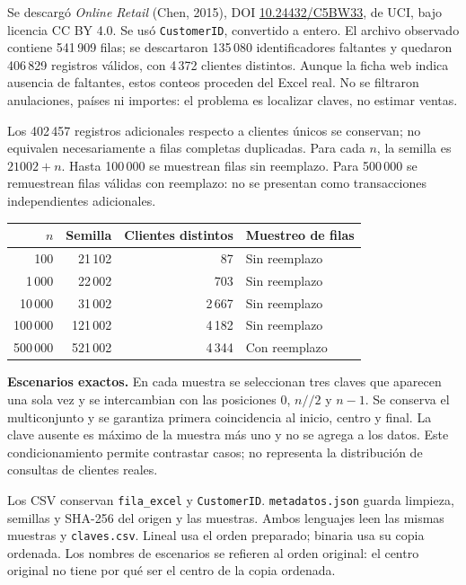 \documentclass[10pt,a4paper]{article}
\newcommand{\titulo}[1]{\vspace{3pt}{\large\bfseries\color{azul}#1}\par}
\begin{document}


\newpage
\titulo{3. Dataset y preparación}
Se descargó \textit{Online Retail} (Chen, 2015), DOI \href{https://doi.org/10.24432/C5BW33}{10.24432/C5BW33}, de UCI, bajo licencia CC BY 4.0. Se usó \texttt{CustomerID}, convertido a entero. El archivo observado contiene 541\,909 filas; se descartaron 135\,080 identificadores faltantes y quedaron 406\,829 registros válidos, con 4\,372 clientes distintos. Aunque la ficha web indica ausencia de faltantes, estos conteos proceden del Excel real. No se filtraron anulaciones, países ni importes: el problema es localizar claves, no estimar ventas.

Los 402\,457 registros adicionales respecto a clientes únicos se conservan; no equivalen necesariamente a filas completas duplicadas. Para cada $n$, la semilla es $21002+n$. Hasta 100\,000 se muestrean filas sin reemplazo. Para 500\,000 se remuestrean filas válidas con reemplazo: no se presentan como transacciones independientes adicionales.
\begin{center}
\begin{tabular}{rrrl}
\toprule
$n$ & Semilla & Clientes distintos & Muestreo de filas\\\midrule
100 & 21\,102 & 87 & Sin reemplazo\\
1\,000 & 22\,002 & 703 & Sin reemplazo\\
10\,000 & 31\,002 & 2\,667 & Sin reemplazo\\
100\,000 & 121\,002 & 4\,182 & Sin reemplazo\\
500\,000 & 521\,002 & 4\,344 & Con reemplazo\\\bottomrule
\end{tabular}\end{center}
\textbf{Escenarios exactos.} En cada muestra se seleccionan tres claves que aparecen una sola vez y se intercambian con las posiciones $0$, $n//2$ y $n-1$. Se conserva el multiconjunto y se garantiza primera coincidencia al inicio, centro y final. La clave ausente es máximo de la muestra más uno y no se agrega a los datos. Este condicionamiento permite contrastar casos; no representa la distribución de consultas de clientes reales.

Los CSV conservan \texttt{fila\_excel} y \texttt{CustomerID}. \texttt{metadatos.json} guarda limpieza, semillas y SHA-256 del origen y las muestras. Ambos lenguajes leen las mismas muestras y \texttt{claves.csv}. Lineal usa el orden preparado; binaria usa su copia ordenada. Los nombres de escenarios se refieren al orden original: el centro original no tiene por qué ser el centro de la copia ordenada.
\end{document}
